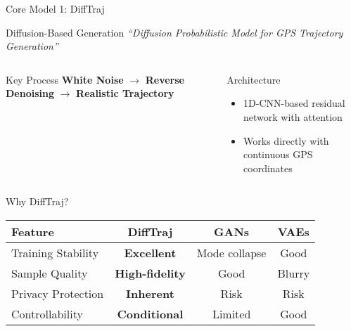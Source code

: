 \documentclass[aspectratio=169,xcolor={dvipsnames}]{beamer}
\newcommand{\highlight}[1]{\textcolor{VUOrange}{\textbf{#1}}}
\begin{document}
\begin{frame}{Core Model 1: DiffTraj \cite{zhuDiffTrajGeneratingGPS2023}}
  \begin{block}{Diffusion-Based Generation}
    \centering
    \textit{``Diffusion Probabilistic Model for GPS Trajectory Generation''}
  \end{block}
  
  \vspace{1em}
  \begin{columns}
    \begin{column}{0.6\textwidth}
      \begin{block}{Key Process}
        \centering
        \textbf{White Noise} $\rightarrow$ \textbf{Reverse Denoising} $\rightarrow$ \textbf{Realistic Trajectory}
      \end{block}
    \end{column}
    \begin{column}{0.4\textwidth}
      \begin{block}{Architecture}
        \begin{itemize}
          \item 1D-CNN-based residual network with attention
          \item Works directly with continuous GPS coordinates
        \end{itemize}
      \end{block}
    \end{column}
  \end{columns}
\end{frame}

\begin{frame}{Why DiffTraj?}
  \begin{table}[h]
    \centering
    \begin{tabular}{lccc}
      \toprule
      \textbf{Feature} & \textbf{DiffTraj} & \textbf{GANs} & \textbf{VAEs} \\
      \midrule
      Training Stability & \highlight{Excellent} & Mode collapse & Good \\
      Sample Quality & \highlight{High-fidelity} & Good & Blurry \\
      Privacy Protection & \highlight{Inherent} & Risk & Risk \\
      Controllability & \highlight{Conditional} & Limited & Good \\
      \bottomrule
    \end{tabular}
  \end{table}
\end{frame}
\end{document}
